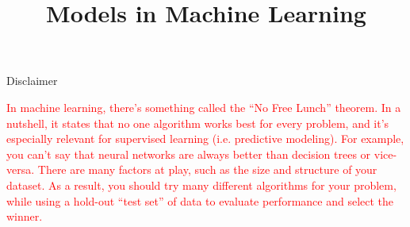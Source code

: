 \documentclass[11pt,compress,t,notes=noshow, xcolor=table]{beamer}
\title{Models in Machine Learning}
\institute{\href{https://compstat-lmu.github.io/lecture_i2ml/}{compstat-lmu.github.io/lecture\_i2ml}}
\date{}
\begin{document}








% 





\begin{frame}{Disclaimer}

\textcolor{red}{In machine learning, there’s something called the “No Free 
Lunch” theorem. In a nutshell, it states that no one algorithm works best for 
every problem, and it’s 
especially relevant for supervised learning (i.e. predictive modeling).
For example, you can’t say that neural networks are always better than decision 
trees or vice-versa. There are many factors at play, such as the size and 
structure of your dataset.
As a result, you should try many different algorithms for your problem, while 
using a hold-out “test set” of data to evaluate performance and select the 
winner.}

\end{frame}

\end{document}
